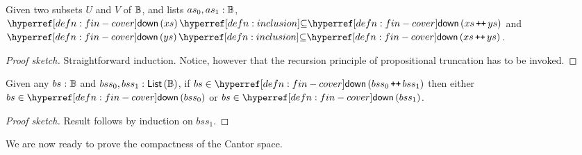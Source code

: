 \begin{lemma}\label{lem:comp2}
  Given two subsets $U$ and $V$ of $\mathbb{B}{}$, and lists
  $as_0, as_1:\mathbb{B}{}$,
  $\subsetof{\fincover{xs}}{\fincover{xs \concat ys}}$ and
  $\subsetof{\fincover{ys}}{\fincover{xs \concat ys}}$.
\end{lemma}
\begin{proof}[Proof sketch]
  Straightforward induction. Notice, however that the recursion principle of propositional
  truncation has to be invoked.
\end{proof}

\begin{lemma}\label{lem:comp3}
  Given any $bs\hspace{0.1mm}:\hspace{0.1mm}\mathbb{B}{}$ and $bss_0, bss_1:\mathsf{List}{}\left(\mathbb{B}{}\right)$, if
  $bs \in \fincover{bss_0 \concat bss_1}$ then either $bs \in \fincover{bss_0}$ or
  $bs \in \fincover{bss_1}$.
\end{lemma}
\begin{proof}[Proof sketch]
  Result follows by induction on $bss_1$.
\end{proof}

We are now ready to prove the compactness of the Cantor space.

